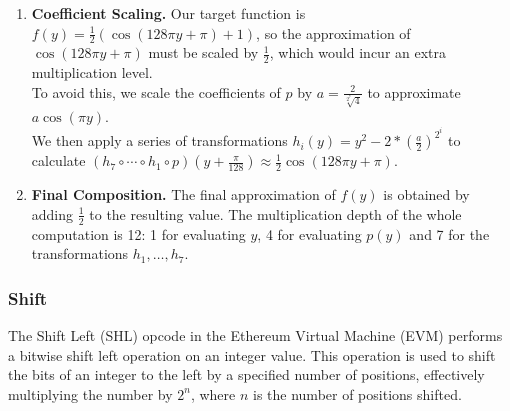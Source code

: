 \documentclass[article]{iacrtrans}
\begin{document}
\begin{enumerate}
    \item \textbf{Coefficient Scaling.} Our target function is $f(y) = \frac{1}{2}(\cos(128\pi y + \pi) + 1)$, so the approximation of $\cos(128\pi y + \pi)$ must be scaled by $\frac{1}{2}$, which would incur an extra multiplication level. \\
    To avoid this, we scale the coefficients of $p$ by $a = \frac{2}{ \sqrt[2^7]{4}}$ to approximate $a \cos(\pi y)$. \\
    We then apply a series of transformations $h_i(y) = y^2 - 2 * (\frac{a}{2})^{2^i}$ to calculate $(h_7 \circ \cdots \circ h_1 \circ p)\left(y + \frac{\pi}{128}\right) \approx \frac{1}{2}\cos(128\pi y + \pi)$. \\
    \item \textbf{Final Composition.}
    The final approximation of $f(y)$ is obtained by adding $\frac{1}{2}$ to the resulting value. The multiplication depth of the whole computation is 12: 1 for evaluating $y$, 4 for evaluating $p(y)$ and 7 for the transformations $h_1, \ldots, h_7$.\\    
\end{enumerate}


\subsubsection{Shift}
The Shift Left (SHL) opcode in the Ethereum Virtual Machine (EVM) performs a bitwise shift left operation on an integer value. This operation is used to shift the bits of an integer to the left by a specified number of positions, effectively multiplying the number by $2^n$,  where $n$ is the number of positions shifted. 
\end{document}
